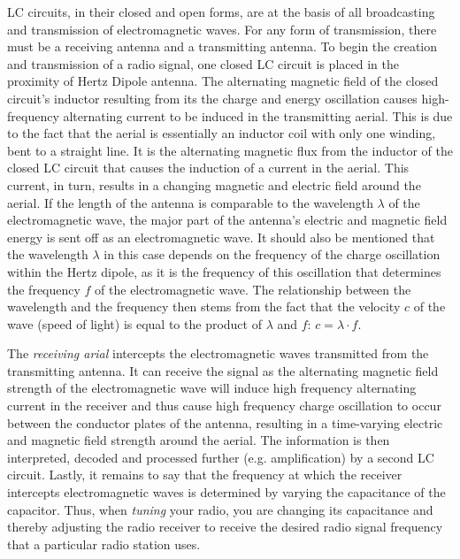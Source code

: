 LC circuits, in their closed and open forms, are at the basis of all broadcasting and transmission of electromagnetic waves. For any form of transmission, there must be a receiving antenna and a transmitting antenna. To begin the creation and transmission of a radio signal, one closed LC circuit is placed in the proximity of Hertz Dipole antenna. The alternating magnetic field of the closed circuit's inductor resulting from its the charge and energy oscillation causes high-frequency alternating current to be induced in the transmitting aerial. This is due to the fact that the aerial is essentially an inductor coil with only one winding, bent to a straight line. It is the alternating magnetic flux from the inductor of the closed LC circuit that causes the induction of a current in the aerial. This current, in turn, results in a changing magnetic and electric field around the aerial. If the length of the antenna is comparable to the wavelength $\lambda$ of the electromagnetic wave, the major part of the antenna's electric and magnetic field energy is sent off as an electromagnetic wave. It should also be mentioned that the wavelength $\lambda$ in this case depends on the frequency of the charge oscillation within the Hertz dipole, as it is the frequency of this oscillation that determines the frequency $f$ of the electromagnetic wave. The relationship between the wavelength and the frequency then stems from the fact that the velocity $c$ of the wave (speed of light) is equal to the product of $\lambda$ and $f$: $c = \lambda \cdot f$.

The \emph{receiving arial} intercepts the electromagnetic waves transmitted from the transmitting antenna. It can receive the signal as the alternating magnetic field strength of the electromagnetic wave will induce high frequency alternating current in the receiver and thus cause high frequency charge oscillation to occur between the conductor plates of the antenna, resulting in a time-varying electric and magnetic field strength around the aerial. The information is then interpreted, decoded and processed further (e.g. amplification) by a second LC circuit. Lastly, it remains to say that the frequency at which the receiver intercepts electromagnetic waves is determined by varying the capacitance of the capacitor. Thus, when \emph{tuning} your radio, you are changing its capacitance and thereby adjusting the radio receiver to receive the desired radio signal frequency that a particular radio station uses.

\pagebreak

